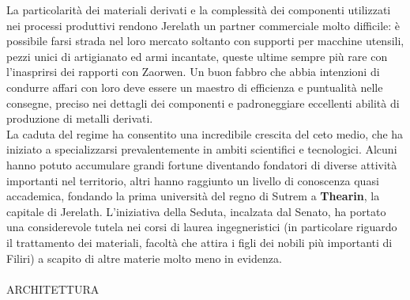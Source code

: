 \documentclass[a4paper]{scrreprt}
\begin{document}
La particolarità dei materiali derivati e la complessità dei componenti utilizzati nei processi produttivi rendono Jerelath un partner commerciale molto difficile: è possibile farsi strada nel loro mercato soltanto con supporti per macchine utensili, pezzi unici di artigianato ed armi incantate, queste ultime sempre più rare con l'inasprirsi dei rapporti con Zaorwen. Un buon fabbro che abbia intenzioni di condurre affari con loro deve essere un maestro di efficienza e puntualità nelle consegne, preciso nei dettagli dei componenti e padroneggiare eccellenti abilità di produzione di metalli derivati.\\
La caduta del regime ha consentito una incredibile crescita del ceto medio, che ha iniziato a specializzarsi prevalentemente in ambiti scientifici e tecnologici. Alcuni hanno potuto accumulare grandi fortune diventando fondatori di diverse attività importanti nel territorio, altri hanno raggiunto un livello di conoscenza quasi accademica, fondando la prima università del regno di Sutrem a \textbf{Thearin}, la capitale di Jerelath. L'iniziativa della Seduta, incalzata dal Senato, ha portato una considerevole tutela nei corsi di laurea ingegneristici (in particolare riguardo il trattamento dei materiali, facoltà che attira i figli dei nobili più importanti di Filiri) a scapito di altre materie molto meno in evidenza.\\
\\

ARCHITETTURA\\
\end{document}

